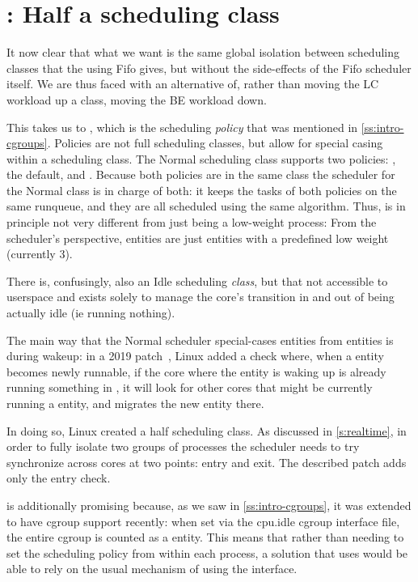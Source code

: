 
\section{\schedidle{}: Half a scheduling class}\label{s:idle}

It now clear that what we want is the same global isolation between scheduling
classes that the using Fifo gives, but without the side-effects of the Fifo
scheduler itself. We are thus faced with an alternative of, rather than moving
the LC workload up a class, moving the BE workload down.

This takes us to \schedidle{}, which is the scheduling \textit{policy} that was
mentioned in \autoref{ss:intro-cgroups}. Policies are not full scheduling classes, but
allow for special casing within a scheduling class. The Normal scheduling class
supports two policies: \schednormal{}, the default, and \schedidle{}. Because
both policies are in the same class the scheduler for the Normal class is in
charge of both: it keeps the tasks of both policies on the same runqueue, and
they are all scheduled using the same algorithm. Thus, \schedidle{} is in
principle not very different from just being a low-weight process: From the
scheduler's perspective, \schedidle{} entities are just entities with a
predefined low weight (currently 3).

There is, confusingly, also an Idle scheduling \textit{class}, but that not
accessible to userspace and exists solely to manage the core's transition in and
out of being actually idle (ie running nothing).

The main way that the Normal scheduler special-cases \schedidle{} entities from
\schednormal{} entities is during wakeup: in a 2019 patch~\cite{TODO}, Linux
added a check where, when a \schednormal{} entity becomes newly runnable, if the
core where the entity is waking up is already running something in
\schednormal{}, it will look for other cores that might be currently running a
\schedidle{} entity, and migrates the new entity there.

In doing so, Linux created a half scheduling class. As discussed in
\autoref{s:realtime}, in order to fully isolate two groups of processes the
scheduler needs to try synchronize across cores at two points: entry and exit.
The described patch adds only the entry check.

\schedidle{} is additionally promising because, as we saw in
\autoref{ss:intro-cgroups}, it was extended to have cgroup support
recently\cite{TODO}: when set via the cpu.idle cgroup interface file, the entire
cgroup is counted as a \schedidle{} entity. This means that rather than needing
to set the scheduling policy from within each process, a solution that uses
\schedidle{} would be able to rely on the usual mechanism of using the
\cgroups{} interface.

